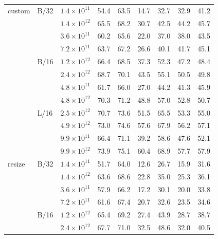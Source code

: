 \begin{table}[h]
{{\begin{tabular}{lllrrrrrr}
custom & B/32 & $1.4\times 10^{11}$ &     54.4 &   63.5 &       14.7 &   32.7 &      32.9 &   41.2 \\
       &      & $1.4\times 10^{12}$ &     65.5 &   68.2 &       30.7 &   42.5 &      44.2 &   45.7 \\
       &      & $3.6\times 10^{11}$ &     60.2 &   65.6 &       22.0 &   37.0 &      38.0 &   43.5 \\
       &      & $7.2\times 10^{11}$ &     63.7 &   67.2 &       26.6 &   40.1 &      41.7 &   45.1 \\
       \midrule
       & B/16 & $1.2\times 10^{12}$ &     66.4 &   68.5 &       37.3 &   52.3 &      47.2 &   48.4 \\
       &      & $2.4\times 10^{12}$ &     68.7 &   70.1 &       43.5 &   55.1 &      50.5 &   49.8 \\
       &      & $4.8\times 10^{11}$ &     61.7 &   66.0 &       27.0 &   44.2 &      41.3 &   45.9 \\
       &      & $4.8\times 10^{12}$ &     70.3 &   71.2 &       48.8 &   57.0 &      52.8 &   50.7 \\
       \midrule
       & L/16 & $2.5\times 10^{12}$ &     70.7 &   73.6 &       51.5 &   65.5 &      53.3 &   55.0 \\
       &      & $4.9\times 10^{12}$ &     73.0 &   74.6 &       57.6 &   67.9 &      56.2 &   57.1 \\
       &      & $9.9\times 10^{11}$ &     66.4 &   71.1 &       39.2 &   58.6 &      47.6 &   52.1 \\
       &      & $9.9\times 10^{12}$ &     73.9 &   75.1 &       60.4 &   68.9 &      57.7 &   57.9 \\
\midrule \midrule
resize & B/32 & $1.4\times 10^{11}$ &     51.7 &   64.0 &       12.6 &   26.7 &      15.9 &   31.6 \\
       &      & $1.4\times 10^{12}$ &     63.6 &   68.6 &       22.8 &   35.0 &      25.3 &   36.1 \\
       &      & $3.6\times 10^{11}$ &     57.9 &   66.2 &       17.2 &   30.1 &      20.0 &   33.8 \\
       &      & $7.2\times 10^{11}$ &     61.6 &   67.4 &       20.7 &   32.6 &      23.5 &   34.6 \\
       \midrule
       & B/16 & $1.2\times 10^{12}$ &     65.4 &   69.2 &       27.4 &   43.9 &      28.7 &   38.7 \\
       &      & $2.4\times 10^{12}$ &     67.7 &   71.0 &       32.5 &   48.6 &      32.0 &   40.5 \\

\end{tabular}}}
\end{table}
